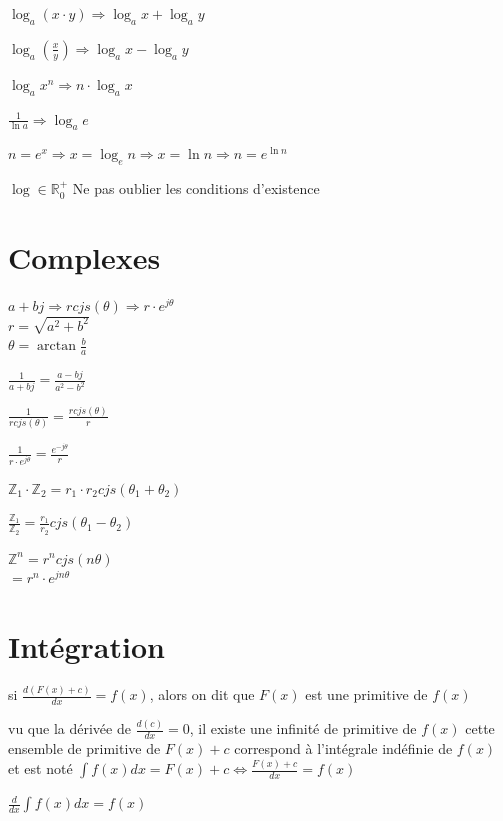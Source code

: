 \documentclass[a4paper,12pt]{article}
\newcommand\tab[1][]{\hspace*{#1}}
\newcommand\Warning{%
 \makebox[1.4em][c]{%
 \makebox[0pt][c]{\raisebox{.1em}{\small!}}%
 \makebox[0pt][c]{\color{red}\Large$\bigtriangleup$}}}%
\begin{document}
$\log_a (x \cdot y) \Rightarrow \log_a x + \log_a y$

$\log_a (\frac{x}{y} ) \Rightarrow \log_a x - \log_a y$

$\log_a x^n \Rightarrow n \cdot \log_a x$

$\frac{1}{\ln a} \Rightarrow \log_a e$

$n = e^x \Rightarrow x = \log_e n \Rightarrow x = \ln n \Rightarrow n = e^{\ln n}$

\vspace{\baselineskip}
\Warning{} $\log \in \mathbb{R}^+_0$ Ne pas oublier les conditions d'existence

\newpage
\section{Complexes}

$a + bj \Rightarrow r cjs(\theta ) \Rightarrow r \cdot e^{j\theta}$ \\
\tab[1cm]$r=\sqrt{a^2 + b^2}$ \\
\tab[1cm]$\theta = \arctan \frac{b}{a}$

$\frac{1}{a + bj} = \frac{a - bj}{a^2 - b^2}$

$\frac{1}{rcjs(\theta)} = \frac{rcjs(\theta)}{r}$

$\frac{1}{r \cdot e^{j\theta}} = \frac{e^{-j\theta}}{r}$

$\mathbb{Z}_1 \cdot \mathbb{Z}_2 = r_1 \cdot r_2 cjs(\theta_1 + \theta_2)$

$\frac{\mathbb{Z}_1}{\mathbb{Z}_2}  = \frac{r_1}{r_2} cjs(\theta_1 - \theta_2)$

$\mathbb{Z}^n = r^ncjs(n\theta)$\\
\tab[.6cm]$= r^n \cdot e^{jn\theta}$

\newpage
\section{Intégration}

si $\frac{d(F(x)+c)}{dx} = f(x)$, alors on dit que $F(x)$ est une primitive de $f(x)$

\Warning vu que la dérivée de $\frac{d(c)}{dx}=0$, il existe une infinité de primitive de $f(x)$ cette ensemble de primitive de $F(x)+c$ correspond à l'intégrale indéfinie de $f(x)$ et est noté $\int{f(x)dx=F(x)+c} \Leftrightarrow \frac{F(x)+c}{dx}=f(x)$  

\vspace{\baselineskip}
$\frac{d}{dx}\int{f(x)dx}=f(x)$
\end{document}
